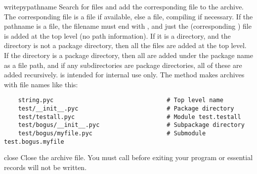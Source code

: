 \begin{methoddesc}{writepy}{pathname}
  Search for files  and add the corresponding file to the
  archive.  The corresponding file is a  file if
  available, else a  file, compiling if necessary.  If the
  pathname is a file, the filename must end with , and just
  the (corresponding ) file is added at the top level
  (no path information).  If it is a directory, and the directory is
  not a package directory, then all the files  are
  added at the top level.  If the directory is a package directory,
  then all  are added under the package name as a file
  path, and if any subdirectories are package directories, all of
  these are added recursively.   is intended for
  internal use only.  The  method makes archives
  with file names like this:

\begin{verbatim}
    string.pyc                                # Top level name 
    test/__init__.pyc                         # Package directory 
    test/testall.pyc                          # Module test.testall
    test/bogus/__init__.pyc                   # Subpackage directory 
    test/bogus/myfile.pyc                     # Submodule test.bogus.myfile
\end{verbatim}
\end{methoddesc}

\begin{methoddesc}{close}{}
  Close the archive file.  You must call  before
  exiting your program or essential records will not be written. 
\end{methoddesc}
